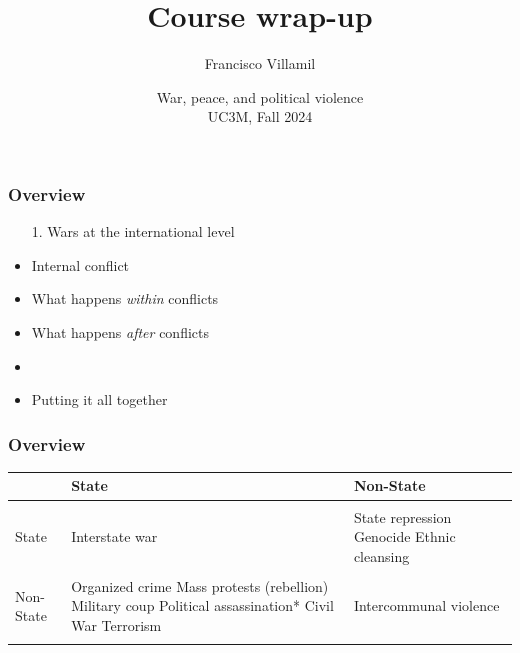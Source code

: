\documentclass[aspectratio=43]{beamer}
\title{\huge Course wrap-up}
\author{Francisco Villamil}
\date{War, peace, and political violence\\UC3M, Fall 2024}
\begin{document}
\begin{frame}
  \titlepage
\end{frame}

\begin{frame}
\frametitle{Overview}
\centering

\begin{itemize}
  \item[1.] Wars at the international level
  \item<2->[2.] Internal conflict
  \item<3->[3.] What happens \textit{within} conflicts
  \item<4->[4.] What happens \textit{after} conflicts
  \item<5->[]
  \item<5->[$\rightarrow$] Putting it all together
\end{itemize}

\end{frame}

\begin{frame}
\frametitle{Overview}
\centering

\begin{tabular}{m{1.75cm}|m{4cm}m{4cm}}
& {\color{gray}{\footnotesize Target:}} \newline State & {\color{gray}{\footnotesize Target:}} \newline Non-State \\\hline\\
{\color{gray}{\footnotesize Perpetrator:}} \newline State & Interstate war & State repression \newline Genocide \newline Ethnic cleansing \\\\
{\color{gray}{\footnotesize Perpetrator:}} \newline Non-State & Organized crime \newline Mass protests (rebellion) \newline Military coup \newline Political assassination* \newline Civil War \newline Terrorism & Intercommunal violence\\\\\hline
\end{tabular}

\end{frame}
\end{document}
